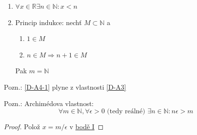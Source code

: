 \begin{definitionAi}\noindent\label{D-A4}
	\begin{enumerate}[I]
		\item\label{D-A4-1} $\forall x\in\mathbb{R}\exists n\in\mathbb{N}: x<n$
		\item Princip indukce: nechť $M\subset\mathbb{N}$ a
		\begin{enumerate}
			\item $1\in M$
			\item $n\in M \Rightarrow n+1\in M$
		\end{enumerate}
		Pak $m=\mathbb{N}$
	\end{enumerate}
\end{definitionAi}

Pozn.: \autoref{D-A4-1} plyne z vlastnosti \autoref{D-A3}

Pozn.: Archimédova vlastnost:
\begin{equation}
	\forall m\in\mathbb{N}, \forall \epsilon>0 \text{ (tedy reálné) }\exists n\in\mathbb{N}:n\epsilon>m
\end{equation}
\begin{proof}
	Polož $x=m/\epsilon$ v \hyperref[D-A4-1]{bodě I}
\end{proof}


